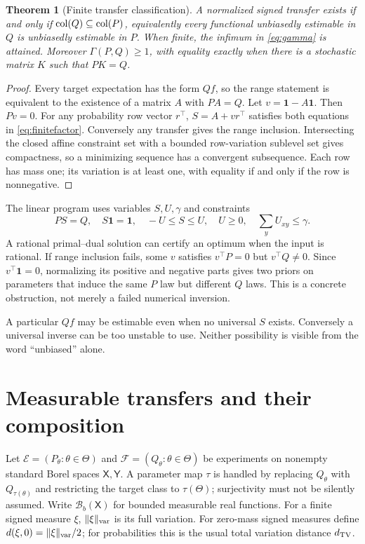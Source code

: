 \documentclass[11pt]{article}
\numberwithin{equation}{section}
\newtheorem{theorem}{Theorem}[section]
\theoremstyle{definition}
\theoremstyle{remark}
\newcommand{\ind}{\mathbf1}\newcommand{\Prob}{\mathcal P}\newcommand{\Ee}{\mathcal E}\newcommand{\Ff}{\mathcal F}
\newcommand{\Bb}{\mathcal B_b}\newcommand{\TV}{d_{\rm TV}}\newcommand{\Var}{\operatorname{Var}}\newcommand{\Pois}{\operatorname{Pois}}
\begin{document}
\begin{theorem}[Finite transfer classification]\label{thm:finite}
A normalized signed transfer exists if and only if $\operatorname{col}(Q)\subseteq\operatorname{col}(P)$, equivalently every functional unbiasedly estimable in $Q$ is unbiasedly estimable in $P$. When finite, the infimum in \eqref{eq:gamma} is attained. Moreover $\Gamma(P,Q)\ge1$, with equality exactly when there is a stochastic matrix $K$ such that $PK=Q$.
\end{theorem}
\begin{proof}
Every target expectation has the form $Qf$, so the range statement is equivalent to the existence of a matrix $A$ with $PA=Q$. Let $v=\ind-A\ind$. Then $Pv=0$. For any probability row vector $r^\top$, $S=A+vr^\top$ satisfies both equations in \eqref{eq:finitefactor}. Conversely any transfer gives the range inclusion. Intersecting the closed affine constraint set with a bounded row-variation sublevel set gives compactness, so a minimizing sequence has a convergent subsequence. Each row has mass one; its variation is at least one, with equality if and only if the row is nonnegative.
\end{proof}
The linear program uses variables $S,U,\gamma$ and constraints
\[
 PS=Q,\quad S\ind=\ind,\quad -U\le S\le U,\quad U\ge0,
 \quad\sum_yU_{xy}\le\gamma.
\]
A rational primal--dual solution can certify an optimum when the input is rational. If range inclusion fails, some $v$ satisfies $v^\top P=0$ but $v^\top Q\ne0$. Since $v^\top\ind=0$, normalizing its positive and negative parts gives two priors on parameters that induce the same $P$ law but different $Q$ laws. This is a concrete obstruction, not merely a failed numerical inversion.

\begin{remark}
A particular $Qf$ may be estimable even when no universal $S$ exists. Conversely a universal inverse can be too unstable to use. Neither possibility is visible from the word ``unbiased'' alone.
\end{remark}

\section{Measurable transfers and their composition}\label{sec:measurable}
Let $\Ee=(P_\theta:\theta\in\Theta)$ and $\Ff=(Q_\theta:\theta\in\Theta)$ be experiments on nonempty standard Borel spaces $\mathsf X,\mathsf Y$. A parameter map $\tau$ is handled by replacing $Q_\theta$ with $Q_{\tau(\theta)}$ and restricting the target class to $\tau(\Theta)$; surjectivity must not be silently assumed. Write $\Bb(\mathsf X)$ for bounded measurable real functions. For a finite signed measure $\xi$, $\|\xi\|_{\rm var}$ is its full variation. For zero-mass signed measures define $d(\xi,0)=\|\xi\|_{\rm var}/2$; for probabilities this is the usual total variation distance $\TV$.
\end{document}

